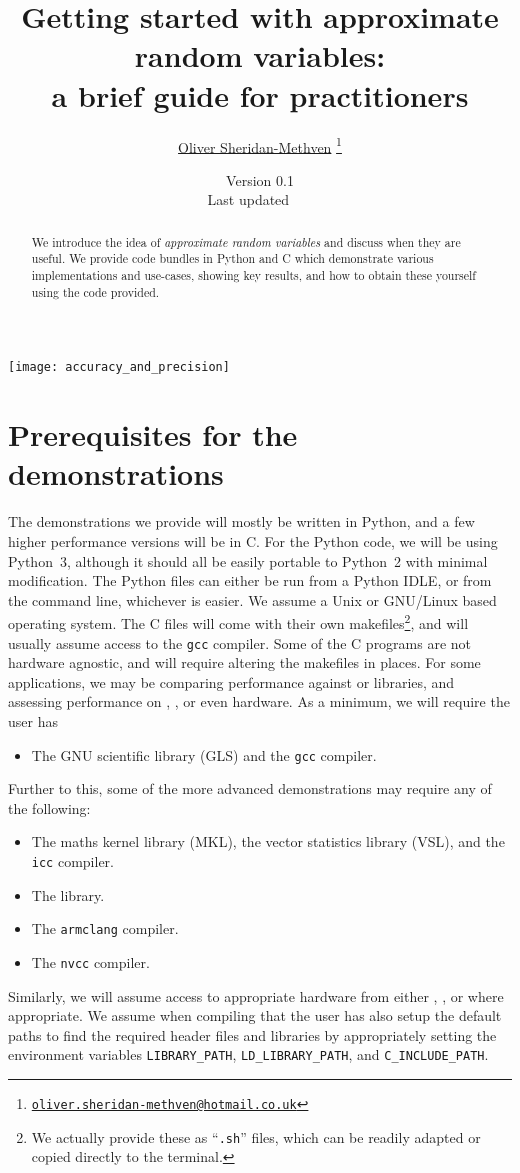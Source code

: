 \documentclass[11pt,a4paper,twoside,english]{extarticle}
\title{\bfseries Getting started with approximate random variables:\\[0.5em] a brief guide for practitioners}
\author{\href{mailto:oliver.sheridan-methven@hotmail.co.uk}{Oliver Sheridan-Methven}%
\thanks{\href{mailto:oliver.sheridan-methven@hotmail.co.uk}%
{\texttt{oliver.sheridan-methven@hotmail.co.uk}}}
}
\date{Version 0.1\\[1em]
Last updated \datedayname\ \nth{\number\day} \monthname\  \number\year}
\begin{document}
\pagestyle{empty}
\maketitle
{}

\begin{abstract}
We introduce the idea of \emph{approximate random variables} and discuss when they are useful. We provide code bundles in Python and C which demonstrate various implementations and use-cases, showing key results, and how to obtain these yourself using the code provided.  
\end{abstract}


\vfill
\centerline{\texttt{[image: accuracy\_and\_precision]}}
\vfill

\clearpage
\tableofcontents
\cleardoublepage
{}
\pagestyle{fancy}

\clearpage
\section{Prerequisites for the demonstrations}

The demonstrations we provide will mostly be written in Python, and a few higher performance versions will be in C. For the Python code, we will be using Python~3, although it should all be easily portable to Python~2 with minimal modification. The Python files can either be run from a Python IDLE, or from the command line, whichever is easier. We assume a Unix or GNU/Linux based operating system. The C files will come with their own makefiles\footnote{We actually provide these as ``\verb|.sh|'' files, which can be readily adapted or copied directly to the terminal.}, and will usually assume access to the \texttt{gcc} compiler. Some of the C programs are not hardware agnostic, and will require altering the makefiles in places. For some applications, we may be comparing performance against \intel or \nag libraries, and assessing performance on \intel, \arm, or even \nvidia hardware. As a minimum, we will require the user has 
\begin{itemize}
\item The GNU scientific library (GLS) and the \texttt{gcc} compiler.
\end{itemize}
Further to this, some of the more advanced demonstrations may require any of the following:
\begin{itemize}
\item The \intel maths kernel library (MKL), the vector statistics library (VSL), and the \texttt{icc} compiler. 
\item The \nag library. 
\item The \arm \texttt{armclang} compiler.
\item The \nvidia \texttt{nvcc} compiler.
\end{itemize} 
Similarly, we will assume access to appropriate hardware from either \intel, \arm, or \nvidia where appropriate. We assume when compiling that the user has also setup the default paths to find the required header files and libraries by appropriately setting the environment variables \verb|LIBRARY_PATH|, \verb|LD_LIBRARY_PATH|, and \verb|C_INCLUDE_PATH|.
\end{document}
